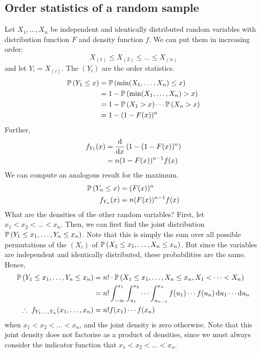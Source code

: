 \subsection{Order statistics of a random sample}
Let \(X_1, \dots, X_n\) be independent and identically distributed random variables with distribution function \(F\) and density function \(f\).
We can put them in increasing order:
\[
	X_{(1)} \leq X_{(2)} \leq \dots \leq X_{(n)}
\]
and let \(Y_i = X_{(i)}\).
The \((Y_i)\) are the order statistics.
\begin{align*}
	\mathbb{P}\left({Y_1 \leq x}\right) & = \mathbb{P}\left({\min(X_1, \dots, X_n) \leq x}\right)    \\
	                  & = 1 - \mathbb{P}\left({\min(X_1, \dots, X_n) > x}\right)   \\
	                  & = 1 - \mathbb{P}\left({X_1 > x}\right)\cdots\mathbb{P}\left({X_n > x}\right) \\
	                  & = 1 - (1 - F(x))^n
\end{align*}
Further,
\begin{align*}
	f_{Y_1}(x) & = \dv{x}\left( 1 - (1 - F(x))^n \right) \\
	           & = n (1 - F(x))^{n-1} f(x)
\end{align*}
We can compute an analogous result for the maximum.
\begin{align*}
	\mathbb{P}\left({Y_n \leq x}\right) & = (F(x))^n           \\
	f_{Y_n}(x)        & = n(F(x))^{n-1} f(x)
\end{align*}
What are the densities of the other random variables?
First, let \(x_1 < x_2 < \dots < x_n\).
Then, we can first find the joint distribution \(\mathbb{P}\left({Y_1 \leq x_1, \dots, Y_n \leq x_n}\right)\).
Note that this is simply the sum over all possible permutations of the \((X_i)\) of \(\mathbb{P}\left({X_1 \leq x_1, \dots, X_n \leq x_n}\right)\).
But since the variables are independent and identically distributed, these probabilities are the same.
Hence,
\begin{align*}
	\mathbb{P}\left({Y_1 \leq x_1, \dots, Y_n \leq x_n}\right)        & = n!
	\cdot \mathbb{P}\left({X_1 \leq x_1, \dots, X_n \leq x_n, X_1 < \dots < X_n}\right)                                               \\
	                                                & = n!
	\int_{-\infty}^{x_1} \int_{u_1}^{x_2} \cdots \int_{u_{n-1}}^{x_n} f(u_1) \cdots f(u_n) \dd{u_1} \cdots \dd{u_n} \\
	\therefore\ f_{Y_1, \dots, Y_n}(x_1, \dots, x_n) & = n!
	f(x_1) \cdots f(x_n)
\end{align*}
when \(x_1 < x_2 < \dots < x_n\), and the joint density is zero otherwise.
Note that this joint density does not factorise as a product of densities, since we must always consider the indicator function that \(x_1 < x_2 < \dots < x_n\).


